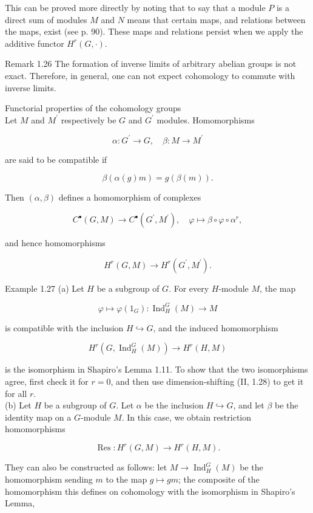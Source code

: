 \documentclass[10pt]{article}
\begin{document}
This can be proved more directly by noting that to say that a module $P$ is a direct sum of modules $M$ and $N$ means that certain maps, and relations between the maps, exist (see p. 90). These maps and relations persist when we apply the additive functor $H^{r}(G, \cdot)$.

Remark 1.26 The formation of inverse limits of arbitrary abelian groups is not exact. Therefore, in general, one can not expect cohomology to commute with inverse limits.

Functorial properties of the cohomology groups\\
Let $M$ and $M^{\prime}$ respectively be $G$ and $G^{\prime}$ modules. Homomorphisms

$$
\alpha: G^{\prime} \rightarrow G, \quad \beta: M \rightarrow M^{\prime}
$$

are said to be compatible if

$$
\beta(\alpha(g) m)=g(\beta(m)) .
$$

Then $(\alpha, \beta)$ defines a homomorphism of complexes

$$
C^{\bullet}(G, M) \rightarrow C^{\bullet}\left(G^{\prime}, M^{\prime}\right), \quad \varphi \mapsto \beta \circ \varphi \circ \alpha^{r},
$$

and hence homomorphisms

$$
H^{r}(G, M) \rightarrow H^{r}\left(G^{\prime}, M^{\prime}\right) .
$$

Example 1.27 (a) Let $H$ be a subgroup of $G$. For every $H$-module $M$, the map

$$
\varphi \mapsto \varphi\left(1_{G}\right): \operatorname{Ind}_{H}^{G}(M) \rightarrow M
$$

is compatible with the inclusion $H \hookrightarrow G$, and the induced homomorphism

$$
H^{r}\left(G, \operatorname{Ind}_{H}^{G}(M)\right) \rightarrow H^{r}(H, M)
$$

is the isomorphism in Shapiro's Lemma 1.11. To show that the two isomorphisms agree, first check it for $r=0$, and then use dimension-shifting (II, 1.28) to get it for all $r$.\\
(b) Let $H$ be a subgroup of $G$. Let $\alpha$ be the inclusion $H \hookrightarrow G$, and let $\beta$ be the identity map on a $G$-module $M$. In this case, we obtain restriction homomorphisms

$$
\operatorname{Res}: H^{r}(G, M) \rightarrow H^{r}(H, M) .
$$

They can also be constructed as follows: let $M \rightarrow \operatorname{Ind}_{H}^{G}(M)$ be the homomorphism sending $m$ to the map $g \mapsto g m$; the composite of the homomorphism this defines on cohomology with the isomorphism in Shapiro's Lemma,
\end{document}
